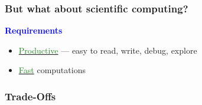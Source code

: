 \documentclass[
    xcolor={svgnames},
    hyperref={colorlinks, citecolor=DeepPink4, linkcolor=DarkRed, urlcolor=DarkBlue}
    ]{beamer}  %
\newcommand{\navy}[1]{\textcolor{Blue}{\bf #1}}
\newcommand{\green}[1]{\textcolor{ForestGreen}{\sf #1}}
\newcommand{\1}{\mathbbm 1}
\begin{document}
\begin{frame}[fragile]
    \frametitle{But what about scientific computing?}
    
    \navy{Requirements}

    \begin{itemize}
        \item \underline{\green{Productive}} --- easy to read, write, debug, explore
            \vspace{0.4em}
            \vspace{0.4em}
            \vspace{0.4em}
        \item \underline{\green{Fast}} computations
    \end{itemize}

\end{frame}




\begin{frame}
    \frametitle{Trade-Offs}

    \begin{figure}
       \begin{center}
       \end{center}
    \end{figure}

\end{frame}
\end{document}
